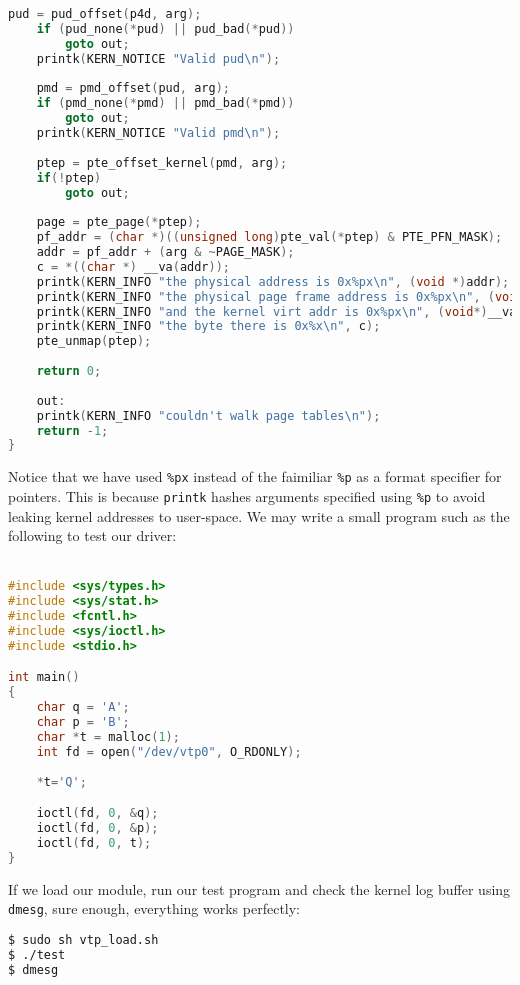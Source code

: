 \documentclass[a4paper,10pt]{article}
\begin{document}
\begin{flushleft}
\begin{lstlisting}[caption={Our ioctl function},label={lst:vtp_ioctl},language=C, style=mystyle]
	pud = pud_offset(p4d, arg);
	if (pud_none(*pud) || pud_bad(*pud))
		goto out;
	printk(KERN_NOTICE "Valid pud\n");
	
	pmd = pmd_offset(pud, arg);
	if (pmd_none(*pmd) || pmd_bad(*pmd))
		goto out;
	printk(KERN_NOTICE "Valid pmd\n");
	
	ptep = pte_offset_kernel(pmd, arg);
	if(!ptep)
		goto out;
	
	page = pte_page(*ptep);
	pf_addr = (char *)((unsigned long)pte_val(*ptep) & PTE_PFN_MASK);
	addr = pf_addr + (arg & ~PAGE_MASK);
	c = *((char *) __va(addr));
	printk(KERN_INFO "the physical address is 0x%px\n", (void *)addr);
	printk(KERN_INFO "the physical page frame address is 0x%px\n", (void *)pf_addr);
	printk(KERN_INFO "and the kernel virt addr is 0x%px\n", (void*)__va(addr));
	printk(KERN_INFO "the byte there is 0x%x\n", c);
	pte_unmap(ptep);
	
	return 0;
	
	out:
	printk(KERN_INFO "couldn't walk page tables\n");
	return -1;
}
\end{lstlisting}

Notice that we have used \verb|%px| instead of the faimiliar \verb|%p| as a format specifier for pointers. This is because \verb|printk| hashes 
arguments specified using \verb|%p| to avoid leaking kernel addresses to user-space. We may write a small program such as the following to test our
driver: \\~\\

\begin{lstlisting}[language=C, style=mystyle]
#include <sys/types.h>
#include <sys/stat.h>
#include <fcntl.h>
#include <sys/ioctl.h>
#include <stdio.h>

int main()
{
	char q = 'A';
	char p = 'B';
	char *t = malloc(1);
	int fd = open("/dev/vtp0", O_RDONLY);
	
	*t='Q';

	ioctl(fd, 0, &q);
	ioctl(fd, 0, &p);
	ioctl(fd, 0, t);
}
\end{lstlisting}

If we load our module, run our test program and check the kernel log buffer using \verb|dmesg|, sure enough, everything works perfectly:

\begin{lstlisting}[language=sh, backgroundcolor=\color{backcolour}]
$ sudo sh vtp_load.sh
$ ./test
$ dmesg

\end{lstlisting}

\end{flushleft}
\end{document}
